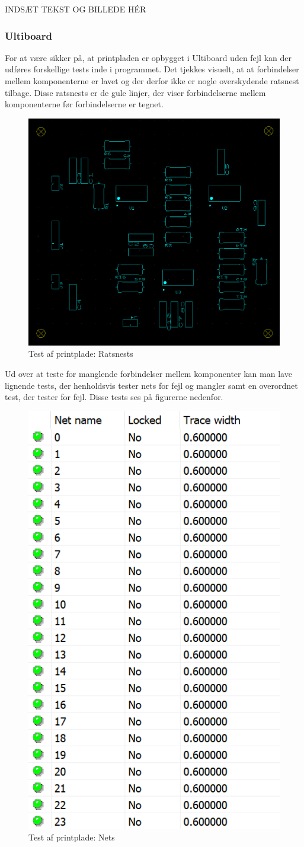 INDSÆT TEKST OG BILLEDE HÉR

\subsubsection{Ultiboard}
For at være sikker på, at printpladen er opbygget i Ultiboard uden fejl kan der udføres forskellige tests inde i programmet. Det tjekkes visuelt, at at forbindelser mellem komponenterne er lavet og der derfor ikke er nogle overskydende ratsnest tilbage. Disse ratsnests er de gule linjer, der viser forbindelserne mellem komponenterne før forbindelserne er tegnet.

\begin{figure}[h!]
	\centering
	\includegraphics[width=0.6\linewidth]{Hardware/Ratsnest}
	\caption{Test af printplade: Ratsnests}
	\label{fig:Ratsnest}
\end{figure}

Ud over at teste for manglende forbindelser mellem komponenter kan man lave lignende tests, der henholdsvis tester nets for fejl og mangler samt en overordnet test, der tester for fejl. Disse tests ses på figurerne nedenfor. 

\begin{figure}[h!]
	\centering
	\includegraphics[width=0.2\linewidth]{Hardware/Nets}
	\caption{Test af printplade: Nets}
	\label{fig:Nets}
\end{figure}

